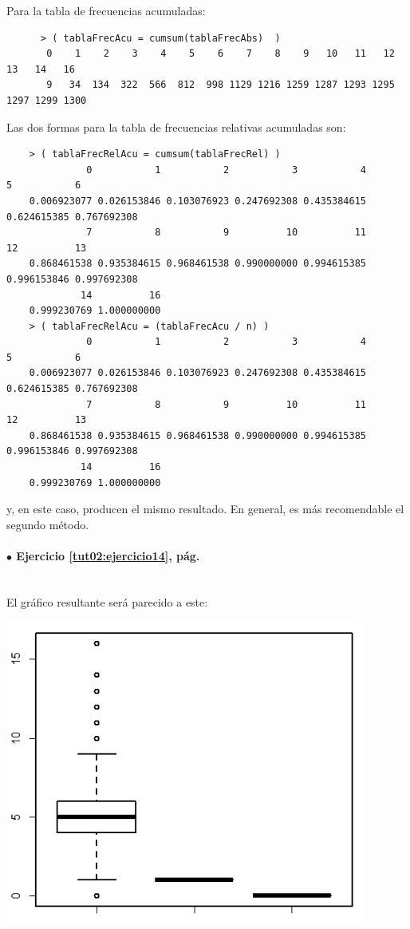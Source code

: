\documentclass[10pt,a4paper]{article}\usepackage[]{graphicx}\usepackage[]{color}
\begin{document}
Para la tabla de frecuencias acumuladas:
\begin{verbatim}
      > ( tablaFrecAcu = cumsum(tablaFrecAbs)  )
       0    1    2    3    4    5    6    7    8    9   10   11   12   13   14   16
       9   34  134  322  566  812  998 1129 1216 1259 1287 1293 1295 1297 1299 1300
\end{verbatim}
Las dos formas para la tabla de frecuencias relativas acumuladas son:
\begin{verbatim}
    > ( tablaFrecRelAcu = cumsum(tablaFrecRel) )
              0           1           2           3           4           5           6
    0.006923077 0.026153846 0.103076923 0.247692308 0.435384615 0.624615385 0.767692308
              7           8           9          10          11          12          13
    0.868461538 0.935384615 0.968461538 0.990000000 0.994615385 0.996153846 0.997692308
             14          16
    0.999230769 1.000000000
    > ( tablaFrecRelAcu = (tablaFrecAcu / n) )
              0           1           2           3           4           5           6
    0.006923077 0.026153846 0.103076923 0.247692308 0.435384615 0.624615385 0.767692308
              7           8           9          10          11          12          13
    0.868461538 0.935384615 0.968461538 0.990000000 0.994615385 0.996153846 0.997692308
             14          16
    0.999230769 1.000000000
\end{verbatim}
y, en este caso,  producen el mismo resultado. En general, es más recomendable el segundo método.

\paragraph{\bf $\bullet$ Ejercicio \ref{tut02:ejercicio14},  pág. \pageref{tut02:ejercicio14}}
\label{tut02:ejercicio14:sol}\quad\\

El gráfico resultante será parecido a este:
    \begin{center}
    \includegraphics[height=10cm]{../fig/Tut02-57.png}
    \end{center}
\end{document}
